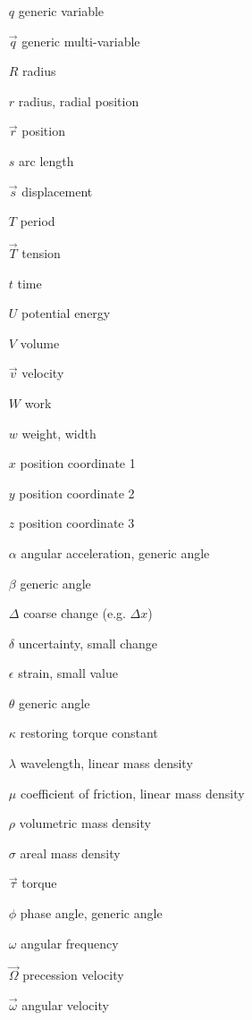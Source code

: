 \begin{itemize}
\item [$q$] generic variable 
\item [$\vec{q}$] generic multi-variable 
\item [$R$] radius
\item [$r$] radius, radial position
\item [$\vec{r}$] position 
\item [$s$] arc length
\item [$\vec{s}$] displacement 
\item [$T$] period 
\item [$\vec{T}$] tension 
\item [$t$] time
\item [$U$] potential energy 
\item [$V$] volume
\item [$\vec{v}$] velocity
\item [$W$] work
\item [$w$] weight, width
\item [$x$] position coordinate 1
\item [$y$] position coordinate 2
\item [$z$] position coordinate 3
\item [$\alpha$] angular acceleration, generic angle
\item [$\beta$] generic angle
\item [$\Delta$] coarse change (e.g. $\Delta x$)
\item [$\delta$] uncertainty, small change 
\item [$\epsilon$] strain, small value
\item [$\theta$] generic angle
\item [$\kappa$] restoring torque constant
\item [$\lambda$] wavelength, linear mass density 
\item [$\mu$] coefficient of friction, linear mass density
\item [$\rho$] volumetric mass density 
\item [$\sigma$] areal mass density
\item [$\vec{\tau}$] torque
\item [$\phi$] phase angle, generic angle 
\item [$\omega$] angular frequency
\item [$\vec{\Omega}$] precession velocity
\item [$\vec{\omega}$] angular velocity
\end{itemize}